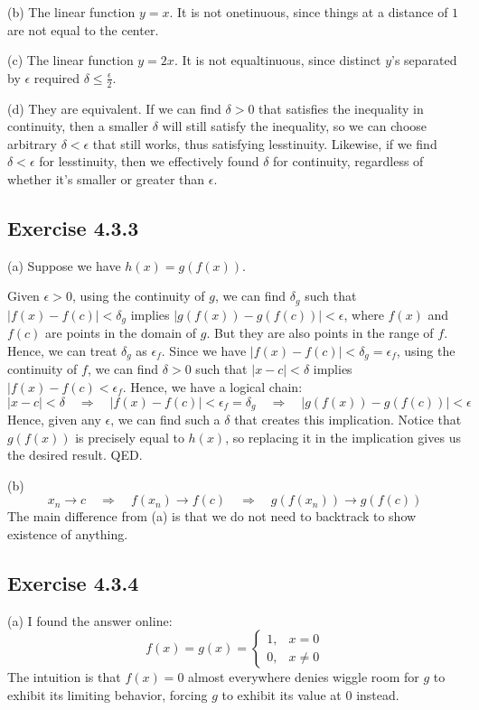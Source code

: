 \documentclass{book}
\begin{document}
\noindent
(b)
The linear function $y = x$. It is not onetinuous, since things at a distance of $1$ are not equal to the center.

\noindent
(c)
The linear function $y = 2x$. It is not equaltinuous, since distinct $y$'s separated by $\epsilon$ required $\delta \leq \frac{\epsilon}{2}$.

\noindent
(d)
They are equivalent. If we can find $\delta > 0$ that satisfies the inequality in continuity, then a smaller $\delta$ will still satisfy the inequality, so we can choose arbitrary $\delta < \epsilon$ that still works, thus satisfying lesstinuity. Likewise, if we find $\delta < \epsilon$ for lesstinuity, then we effectively found $\delta$ for continuity, regardless of whether it's smaller or greater than $\epsilon$.

\subsection*{Exercise 4.3.3}
(a)
Suppose we have $h(x) = g(f(x))$.

Given $\epsilon > 0$, using the continuity of $g$, we can find $\delta_g$ such that $|f(x) - f(c)| < \delta_g$ implies $|g(f(x)) - g(f(c))| < \epsilon$, where $f(x)$ and $f(c)$ are points in the domain of $g$. But they are also points in the range of $f$. Hence, we can treat $\delta_g$ as $\epsilon_f$. Since we have $|f(x) - f(c)| < \delta_g = \epsilon_f$, using the continuity of $f$, we can find $\delta > 0$ such that $|x - c| < \delta$ implies $|f(x) - f(c) < \epsilon_f$. Hence, we have a logical chain:
$$|x - c| < \delta \quad \Rightarrow \quad |f(x) - f(c)| < \epsilon_f = \delta_g \quad \Rightarrow \quad |g(f(x)) - g(f(c))| < \epsilon$$
Hence, given any $\epsilon$, we can find such a $\delta$ that creates this implication. Notice that $g(f(x))$ is precisely equal to $h(x)$, so replacing it in the implication gives us the desired result. QED.

\noindent
(b)
$$x_n \rightarrow c \quad \Rightarrow \quad f(x_n) \rightarrow f(c) \quad \Rightarrow \quad g(f(x_n)) \rightarrow g(f(c))$$
The main difference from (a) is that we do not need to backtrack to show existence of anything.

\subsection*{Exercise 4.3.4}
(a)
I found the answer online:
$$f(x) = g(x) = \begin{cases}
    1, & x = 0 \\
    0, & x \neq 0
\end{cases}$$
The intuition is that $f(x) = 0$ almost everywhere denies wiggle room for $g$ to exhibit its limiting behavior, forcing $g$ to exhibit its value at $0$ instead.
\end{document}
